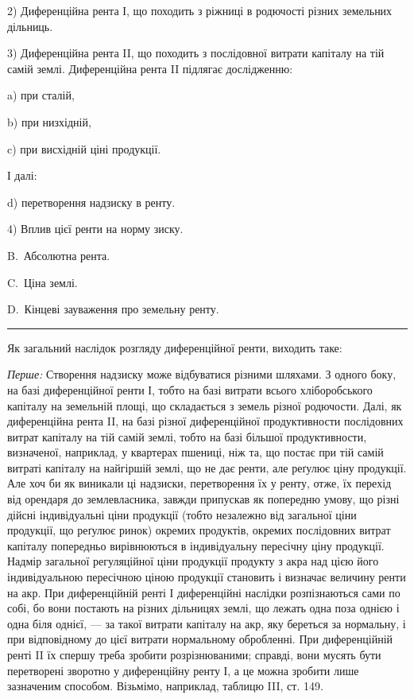 \parcont{}  %
2) Диференційна рента І, що походить з ріжниці в родючості різних земельних
дільниць.

3) Диференційна рента II, що походить з послідовної витрати капіталу
на тій самій землі. Диференційна рента II підлягає дослідженню:

a) при сталій,

b) при низхідній,

c) при висхідній ціні продукції.

І далі:

d) перетворення надзиску в ренту.

4) Вплив цієї ренти на норму зиску.

B.~Абсолютна рента.

C.~Ціна землі.

D.~Кінцеві зауваження про земельну ренту.

\pfbreak

Як загальний наслідок розгляду диференційної ренти, виходить таке:

\emph{Перше:} Створення надзиску може відбуватися різними шляхами. З одного
боку, на базі диференційної ренти І, тобто на базі витрати всього
хліборобського капіталу на земельній площі, що складається з земель різної
родючости. Далі, як диференційна рента II, на базі різної диференційної продуктивности
послідовних витрат капіталу на тій самій землі, тобто на базі
більшої продуктивности, визначеної, наприклад, у квартерах пшениці, ніж та,
що постає при тій самій витраті капіталу на найгіршій землі, що не дає ренти,
але реґулює ціну продукції. Але хоч би як виникали ці надзиски, перетворення
їх у ренту, отже, їх перехід від орендаря до землевласника, завжди припускав
як попередню умову, що різні дійсні індивідуальні ціни продукції (тобто незалежно
від загальної ціни продукції, що реґулює ринок) окремих продуктів, окремих
послідовних витрат капіталу попередньо вирівнюються в індивідуальну
пересічну ціну продукції. Надмір загальної регуляційної ціни продукції продукту
з акра над цією його індивідуальною пересічною ціною продукції становить
і визначає величину ренти на акр. При диференційній ренті І диференційні
наслідки розпізнаються сами по собі, бо вони постають на різних дільницях
землі, що лежать одна поза однією і одна біля однієї, — за такої витрати капіталу
на акр, яку береться за нормальну, і при відповідному до цієї витрати
нормальному обробленні. При диференційній ренті II їх спершу треба зробити
розрізнюваними; справді, вони мусять бути перетворені зворотно у диференційну
ренту І, а це можна зробити лише зазначеним способом. Візьмімо, наприклад,
таблицю III, ст. 149.

